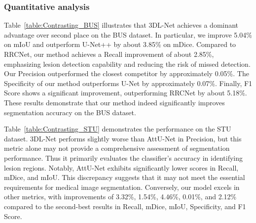 \documentclass[review]{elsarticle}
\begin{document}
	\subsubsection{Quantitative analysis}

		Table~\ref{table:Contrasting_BUS} illustrates that 3DL-Net achieves a dominant advantage over second place on the BUS dataset. In particular, we improve 5.04\% on mIoU and outperform U-Net++ by about 3.85\% on mDice. Compared to RRCNet, our method achieves a Recall improvement of about 2.85\%, emphasizing lesion detection capability and reducing the risk of missed detection. Our Precision outperformed the closest competitor by approximately 0.05\%. The Specificity of our method outperforms U-Net by approximately 0.07\%. Finally, F1 Score shows a significant improvement, outperforming RRCNet by about 5.18\%. These results demonstrate that our method indeed significantly improves segmentation accuracy on the BUS dataset.
		
		Table~\ref{table:Contrasting_STU} demonstrates the performance on the STU dataset. 3DL-Net performs slightly worse than AttU-Net in Precision, but this metric alone may not provide a comprehensive assessment of segmentation performance. Thus it primarily evaluates the classifier's accuracy in identifying lesion regions. Notably, AttU-Net exhibits significantly lower scores in Recall, mDice, and mIoU. This discrepancy suggests that it may not meet the essential requirements for medical image segmentation. Conversely, our model excels in other metrics, with improvements of 3.32\%, 1.54\%, 4.46\%, 0.01\%, and 2.12\% compared to the second-best results in Recall, mDice, mIoU, Specificity, and F1 Score.
			
\end{document}
